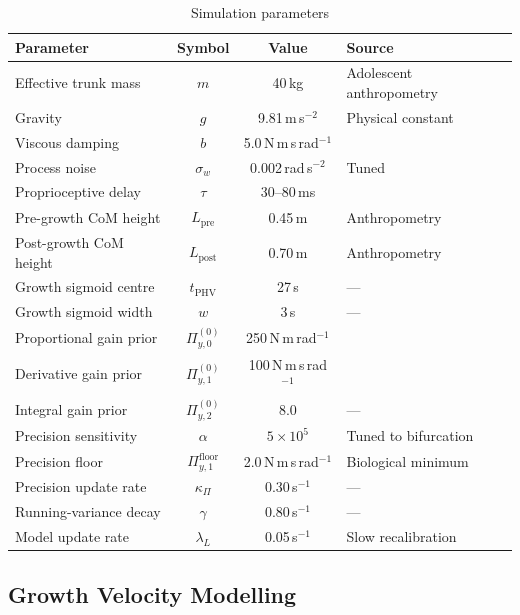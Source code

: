 \documentclass[12pt, letterpaper]{article}
\newcommand{\Piy}{\Pi_{y,1}}
\begin{document}
\begin{table}[H]
  \centering
  \caption{Simulation parameters}
  \label{tab:params}
  \renewcommand{\arraystretch}{1.3}
  \begin{tabular}{lccl}
    \toprule
    Parameter & Symbol & Value & Source \\
    \midrule
    Effective trunk mass & $m$ & 40\,kg & Adolescent anthropometry \\
    Gravity & $g$ & 9.81\,m\,s$^{-2}$ & Physical constant \\
    Viscous damping & $b$ & 5.0\,N\,m\,s\,rad$^{-1}$ & \citet{Peterka2002} \\
    Process noise & $\sigma_w$ & 0.002\,rad\,s$^{-2}$ & Tuned \\
    Proprioceptive delay & $\tau$ & 30--80\,ms & \citet{Fitzpatrick1994} \\
    Pre-growth CoM height & $L_{\mathrm{pre}}$ & 0.45\,m & Anthropometry \\
    Post-growth CoM height & $L_{\mathrm{post}}$ & 0.70\,m & Anthropometry \\
    Growth sigmoid centre & $t_{\mathrm{PHV}}$ & 27\,s & — \\
    Growth sigmoid width & $w$ & 3\,s & — \\
    Proportional gain prior & $\Pi_{y,0}^{(0)}$ & 250\,N\,m\,rad$^{-1}$ & \citet{Peterka2002} \\
    Derivative gain prior & $\Piy^{(0)}$ & 100\,N\,m\,s\,rad$^{-1}$ & \citet{Peterka2002} \\
    Integral gain prior & $\Pi_{y,2}^{(0)}$ & 8.0 & — \\
    Precision sensitivity & $\alpha$ & $5\times10^{5}$ & Tuned to bifurcation \\
    Precision floor & $\Piy^{\mathrm{floor}}$ & 2.0\,N\,m\,s\,rad$^{-1}$ & Biological minimum \\
    Precision update rate & $\kappa_\Pi$ & 0.30\,s$^{-1}$ & — \\
    Running-variance decay & $\gamma$ & 0.80\,s$^{-1}$ & — \\
    Model update rate & $\lambda_L$ & 0.05\,s$^{-1}$ & Slow recalibration \\
    \bottomrule
  \end{tabular}
\end{table}

\subsection{Growth Velocity Modelling}
\end{document}
